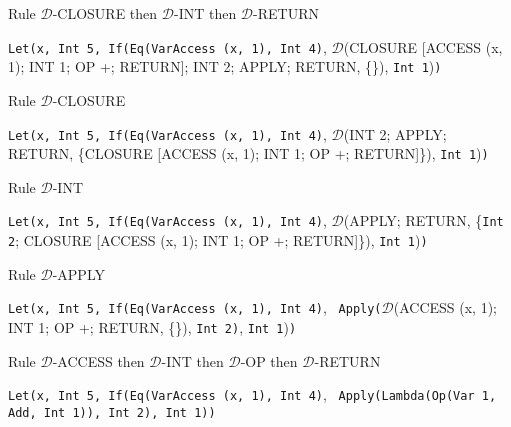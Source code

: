 \documentclass[11pt]{article}
\begin{document}
\begin{landscape}
{\smallskip
\noindent Rule $\mathcal{D}$-CLOSURE then $\mathcal{D}$-INT then $\mathcal{D}$-RETURN
\smallskip

\noindent \texttt{Let(x, Int 5, If(Eq(VarAccess (x, 1), Int 4)}, $\mathcal{D}$(CLOSURE [ACCESS (x, 1); INT 1; OP +; RETURN]; INT 2; APPLY; RETURN, \{\}), \texttt{Int 1})\texttt{)}

\smallskip
\noindent Rule $\mathcal{D}$-CLOSURE
\smallskip

\noindent \texttt{Let(x, Int 5, If(Eq(VarAccess (x, 1), Int 4)}, $\mathcal{D}$(INT 2; APPLY; RETURN, \{CLOSURE [ACCESS (x, 1); INT 1; OP +; RETURN]\}), \texttt{Int 1})\texttt{)}

\smallskip
\noindent Rule $\mathcal{D}$-INT
\smallskip

\noindent \texttt{Let(x, Int 5, If(Eq(VarAccess (x, 1), Int 4)}, $\mathcal{D}$(APPLY; RETURN, \{\texttt{Int 2}; CLOSURE [ACCESS (x, 1); INT 1; OP +; RETURN]\}), \texttt{Int 1})\texttt{)}

\smallskip
\noindent Rule $\mathcal{D}$-APPLY
\smallskip

\noindent \texttt{Let(x, Int 5, If(Eq(VarAccess (x, 1), Int 4)}, \ \texttt{Apply(}$\mathcal{D}$(ACCESS (x, 1); INT 1; OP +; RETURN, \{\}), \texttt{Int 2)}, \texttt{Int 1})\texttt{)}

\smallskip
\noindent Rule $\mathcal{D}$-ACCESS then $\mathcal{D}$-INT then $\mathcal{D}$-OP then $\mathcal{D}$-RETURN
\smallskip

\noindent \texttt{Let(x, Int 5, If(Eq(VarAccess (x, 1), Int 4)}, \ \texttt{Apply(Lambda(Op(Var 1, Add, Int 1)), \texttt{Int 2)}, \texttt{Int 1})\texttt{)}}

}






\end{landscape}
\end{document}
